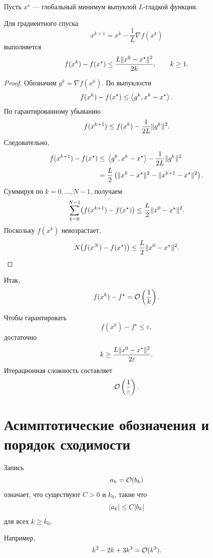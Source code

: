 Пусть \(x^\star\) --- глобальный минимум выпуклой \(L\)-гладкой
функции.

\begin{theorem}
Для градиентного спуска
\[
    x^{k+1}
    =
    x^k-\frac1L\nabla f(x^k)
\]
выполняется
\[
    f(x^k)-f(x^\star)
    \le
    \frac{
        L\lVert x^0-x^\star\rVert^2
    }{
        2k
    },
    \qquad k\ge1.
\]
\end{theorem}

\begin{proof}
Обозначим \(g^k=\nabla f(x^k)\). По выпуклости
\[
    f(x^k)-f(x^\star)
    \le
    \left\langle g^k,x^k-x^\star \right\rangle.
\]
По гарантированному убыванию
\[
    f(x^{k+1})
    \le
    f(x^k)-\frac{1}{2L}\lVert g^k\rVert^2.
\]
Следовательно,
\[
\begin{aligned}
    f(x^{k+1})-f(x^\star)
    \le{}&
    \left\langle g^k,x^k-x^\star \right\rangle
    -
    \frac{1}{2L}\lVert g^k\rVert^2
    \\
    ={}&
    \frac{L}{2}
    \left(
        \lVert x^k-x^\star\rVert^2
        -
        \lVert x^{k+1}-x^\star\rVert^2
    \right).
\end{aligned}
\]
Суммируя по \(k=0,\ldots,N-1\), получаем
\[
    \sum_{k=0}^{N-1}
    \bigl(
        f(x^{k+1})-f(x^\star)
    \bigr)
    \le
    \frac{L}{2}
    \lVert x^0-x^\star\rVert^2.
\]
Поскольку \(f(x^k)\) невозрастает,
\[
    N\bigl(f(x^N)-f(x^\star)\bigr)
    \le
    \frac{L}{2}
    \lVert x^0-x^\star\rVert^2.
\]
\end{proof}

Итак,
\[
    f(x^k)-f^\star
    =
    \mathcal{O}\left(\frac1k\right).
\]

Чтобы гарантировать
\[
    f(x^k)-f^\star\le\varepsilon,
\]
достаточно
\[
    k
    \ge
    \frac{
        L\lVert x^0-x^\star\rVert^2
    }{
        2\varepsilon
    }.
\]
Итерационная сложность составляет
\[
    \mathcal{O}\left(\frac1\varepsilon\right).
\]

\section{Асимптотические обозначения и порядок сходимости}

\begin{definition}[Большое \(O\)]
Запись
\[
    a_k=\mathcal{O}(b_k)
\]
означает, что существуют \(C>0\) и \(k_0\), такие что
\[
    \lvert a_k\rvert
    \le
    C\lvert b_k\rvert
\]
для всех \(k\ge k_0\).
\end{definition}

Например,
\[
    k^2-2k+3k^3
    =
    \mathcal{O}(k^3).
\]

